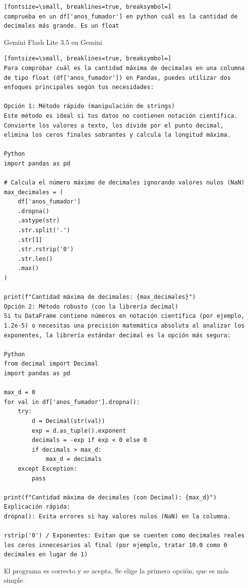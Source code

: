 \documentclass[12pt,a4paper,oneside]{book}
\begin{document}
\begin{iaprompt}
\begin{Verbatim}[fontsize=\small, breaklines=true, breaksymbol=]
comprueba en un df['anos_fumador'] en python cuál es la cantidad de decimales más grande. Es un float
\end{Verbatim}
\end{iaprompt}
\begin{iaresp}{Gemini Flash Lite 3.5 en Gemini}
\begin{Verbatim}[fontsize=\small, breaklines=true, breaksymbol=]
Para comprobar cuál es la cantidad máxima de decimales en una columna de tipo float (df['anos_fumador']) en Pandas, puedes utilizar dos enfoques principales según tus necesidades:

Opción 1: Método rápido (manipulación de strings)
Este método es ideal si tus datos no contienen notación científica. Convierte los valores a texto, los divide por el punto decimal, elimina los ceros finales sobrantes y calcula la longitud máxima.

Python
import pandas as pd

# Calcula el número máximo de decimales ignorando valores nulos (NaN)
max_decimales = (
    df['anos_fumador']
    .dropna()
    .astype(str)
    .str.split('.')
    .str[1]
    .str.rstrip('0')
    .str.len()
    .max()
)

print(f"Cantidad máxima de decimales: {max_decimales}")
Opción 2: Método robusto (con la librería decimal)
Si tu DataFrame contiene números en notación científica (por ejemplo, 1.2e-5) o necesitas una precisión matemática absoluta al analizar los exponentes, la librería estándar decimal es la opción más segura:

Python
from decimal import Decimal
import pandas as pd

max_d = 0
for val in df['anos_fumador'].dropna():
    try:
        d = Decimal(str(val))
        exp = d.as_tuple().exponent
        decimals = -exp if exp < 0 else 0
        if decimals > max_d:
            max_d = decimals
    except Exception:
        pass

print(f"Cantidad máxima de decimales (con Decimal): {max_d}")
Explicación rápida:
dropna(): Evita errores si hay valores nulos (NaN) en la columna.

rstrip('0') / Exponentes: Evitan que se cuenten como decimales reales los ceros innecesarios al final (por ejemplo, tratar 10.0 como 0 decimales en lugar de 1)
\end{Verbatim}
\end{iaresp}
\begin{iaanalisis}
El programa es correcto y se acepta. Se elige la primera opción, que es más simple.
\end{iaanalisis}
\end{document}
